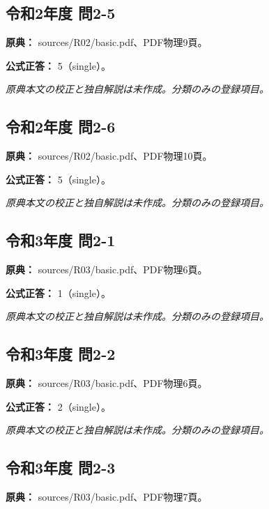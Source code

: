 \subsection{令和2年度 問2-5}
\label{q:r02-reg-basic-2-5}

\noindent\textbf{原典：} sources/R02/basic.pdf、PDF物理9頁。

\textbf{公式正答：} 5（single）。

\par\textit{原典本文の校正と独自解説は未作成。分類のみの登録項目。}

\subsection{令和2年度 問2-6}
\label{q:r02-reg-basic-2-6}

\noindent\textbf{原典：} sources/R02/basic.pdf、PDF物理10頁。

\textbf{公式正答：} 5（single）。

\par\textit{原典本文の校正と独自解説は未作成。分類のみの登録項目。}

\subsection{令和3年度 問2-1}
\label{q:r03-reg-basic-2-1}

\noindent\textbf{原典：} sources/R03/basic.pdf、PDF物理6頁。

\textbf{公式正答：} 1（single）。

\par\textit{原典本文の校正と独自解説は未作成。分類のみの登録項目。}

\subsection{令和3年度 問2-2}
\label{q:r03-reg-basic-2-2}

\noindent\textbf{原典：} sources/R03/basic.pdf、PDF物理6頁。

\textbf{公式正答：} 2（single）。

\par\textit{原典本文の校正と独自解説は未作成。分類のみの登録項目。}

\subsection{令和3年度 問2-3}
\label{q:r03-reg-basic-2-3}

\noindent\textbf{原典：} sources/R03/basic.pdf、PDF物理7頁。

